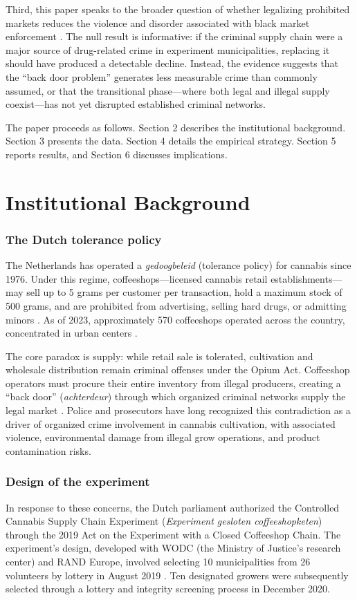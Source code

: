 \documentclass[12pt]{article}
\begin{document}
Third, this paper speaks to the broader question of whether legalizing prohibited markets reduces the violence and disorder associated with black market enforcement \citep{miron1995economic, becker2006market}. The null result is informative: if the criminal supply chain were a major source of drug-related crime in experiment municipalities, replacing it should have produced a detectable decline. Instead, the evidence suggests that the ``back door problem'' generates less measurable crime than commonly assumed, or that the transitional phase---where both legal and illegal supply coexist---has not yet disrupted established criminal networks.

The paper proceeds as follows. Section 2 describes the institutional background. Section 3 presents the data. Section 4 details the empirical strategy. Section 5 reports results, and Section 6 discusses implications.


\section{Institutional Background}

\subsubsection*{The Dutch tolerance policy} The Netherlands has operated a \textit{gedoogbeleid} (tolerance policy) for cannabis since 1976. Under this regime, coffeeshops---licensed cannabis retail establishments---may sell up to 5 grams per customer per transaction, hold a maximum stock of 500 grams, and are prohibited from advertising, selling hard drugs, or admitting minors \citep{maccoun2011dutch}. As of 2023, approximately 570 coffeeshops operated across the country, concentrated in urban centers \citep{trimbos2024monitor}.

The core paradox is supply: while retail sale is tolerated, cultivation and wholesale distribution remain criminal offenses under the Opium Act. Coffeeshop operators must procure their entire inventory from illegal producers, creating a ``back door'' (\textit{achterdeur}) through which organized criminal networks supply the legal market \citep{grund2016beyond}. Police and prosecutors have long recognized this contradiction as a driver of organized crime involvement in cannabis cultivation, with associated violence, environmental damage from illegal grow operations, and product contamination risks.

\subsubsection*{Design of the experiment} In response to these concerns, the Dutch parliament authorized the Controlled Cannabis Supply Chain Experiment (\textit{Experiment gesloten coffeeshopketen}) through the 2019 Act on the Experiment with a Closed Coffeeshop Chain. The experiment's design, developed with WODC (the Ministry of Justice's research center) and RAND Europe, involved selecting 10 municipalities from 26 volunteers by lottery in August 2019 \citep{vanlaar2022cannabis}. Ten designated growers were subsequently selected through a lottery and integrity screening process in December 2020.
\end{document}
